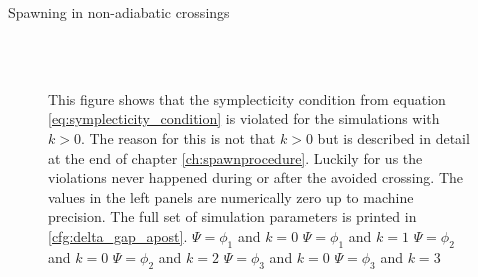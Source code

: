 \begin{chapter}{Spawning in non-adiabatic crossings}
\begin{figure}[h!]
{  } \\
   \\
  \caption[Violation of the condition \eqref{eq:symplecticity_condition} for $k>0$]{
  This figure shows that the symplecticity condition from equation \eqref{eq:symplecticity_condition}
  is violated for the simulations with $k>0$. The reason for this is not that $k>0$ but
  is described in detail at the end of chapter \ref{ch:spawnprocedure}. Luckily
  for us the violations never happened during or after the avoided crossing.
  The values in the left panels are numerically zero up to machine precision.
  The full set of simulation parameters is printed in \ref{cfg:delta_gap_apost}.
   $\Psi = \phi_1$ and $k=0$
   $\Psi = \phi_1$ and $k=1$
   $\Psi = \phi_2$ and $k=0$
   $\Psi = \phi_2$ and $k=2$
   $\Psi = \phi_3$ and $k=0$
   $\Psi = \phi_3$ and $k=3$
  \label{fig:spawn_delta_gap_spawn_pqcond1}
  }
\end{figure}



\end{chapter}
